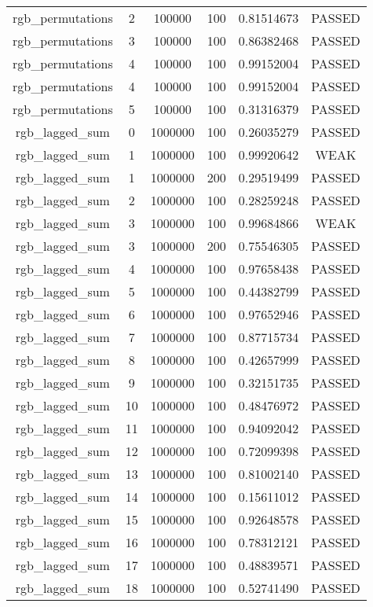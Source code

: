 \begin{longtable}{cccccc}
rgb\_permutations & 2 & 100000 & 100 & 0.81514673 & PASSED \\
rgb\_permutations & 3 & 100000 & 100 & 0.86382468 & PASSED \\
rgb\_permutations & 4 & 100000 & 100 & 0.99152004 & PASSED \\
rgb\_permutations & 4 & 100000 & 100 & 0.99152004 & PASSED \\
rgb\_permutations & 5 & 100000 & 100 & 0.31316379 & PASSED \\
rgb\_lagged\_sum & 0 & 1000000 & 100 & 0.26035279 & PASSED \\
rgb\_lagged\_sum & 1 & 1000000 & 100 & 0.99920642 & WEAK \\
rgb\_lagged\_sum & 1 & 1000000 & 200 & 0.29519499 & PASSED \\
rgb\_lagged\_sum & 2 & 1000000 & 100 & 0.28259248 & PASSED \\
rgb\_lagged\_sum & 3 & 1000000 & 100 & 0.99684866 & WEAK \\
rgb\_lagged\_sum & 3 & 1000000 & 200 & 0.75546305 & PASSED \\
rgb\_lagged\_sum & 4 & 1000000 & 100 & 0.97658438 & PASSED \\
rgb\_lagged\_sum & 5 & 1000000 & 100 & 0.44382799 & PASSED \\
rgb\_lagged\_sum & 6 & 1000000 & 100 & 0.97652946 & PASSED \\
rgb\_lagged\_sum & 7 & 1000000 & 100 & 0.87715734 & PASSED \\
rgb\_lagged\_sum & 8 & 1000000 & 100 & 0.42657999 & PASSED \\
rgb\_lagged\_sum & 9 & 1000000 & 100 & 0.32151735 & PASSED \\
rgb\_lagged\_sum & 10 & 1000000 & 100 & 0.48476972 & PASSED \\
rgb\_lagged\_sum & 11 & 1000000 & 100 & 0.94092042 & PASSED \\
rgb\_lagged\_sum & 12 & 1000000 & 100 & 0.72099398 & PASSED \\
rgb\_lagged\_sum & 13 & 1000000 & 100 & 0.81002140 & PASSED \\
rgb\_lagged\_sum & 14 & 1000000 & 100 & 0.15611012 & PASSED \\
rgb\_lagged\_sum & 15 & 1000000 & 100 & 0.92648578 & PASSED \\
rgb\_lagged\_sum & 16 & 1000000 & 100 & 0.78312121 & PASSED \\
rgb\_lagged\_sum & 17 & 1000000 & 100 & 0.48839571 & PASSED \\
rgb\_lagged\_sum & 18 & 1000000 & 100 & 0.52741490 & PASSED \\

\end{longtable}
